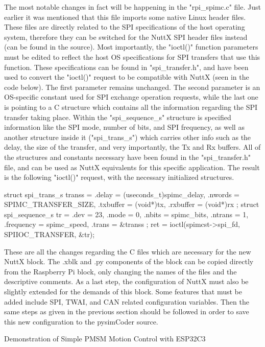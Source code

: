 \quad The most notable changes in fact will be happening in the "rpi_spimc.c" file. Just earlier it was mentioned
that this file imports some native Linux header files. These files are directly related to the SPI specifications
of the host operating system, therefore they can be switched for the NuttX SPI header files instead (can be found
in the source). Most importantly, the "ioctl()" function parameters must be edited to reflect the host OS
specifications for SPI transfers that use this function. These specifications can be found in "spi_transfer.h",
and have been used to convert the "ioctl()" request to be compatible with NuttX (seen in the code below). The
first parameter remains unchanged. The second parameter is an OS-specific constant used for SPI exchange operation
requests, while the last one is pointing to a C structure which contains all the information regarding the SPI
transfer taking place. Within the "spi_sequence_s" structure is specified information like the SPI mode, number of
bits, and SPI frequency, as well as another structure inside it ("spi_trans_s") which carries other info such as the
delay, the size of the transfer, and very importantly, the Tx and Rx buffers. All of the structures and constants
necessary have been found in the "spi_transfer.h" file, and can be used as NuttX equivalents for this specific
application. The result is the following "ioctl()" request, with the necessary initialized structures. 

\begtt
struct spi_trans_s transs = {
    .delay = (useconds_t)spimc_delay,
    .nwords = SPIMC_TRANSFER_SIZE,
    .txbuffer = (void*)tx,
    .rxbuffer = (void*)rx };
struct spi_sequence_s tr = {
	.dev = 23,
	.mode = 0,
	.nbits = spimc_bits,
    .ntrans = 1,
    .frequency = spimc_speed,
    .trans = &transs };  
ret = ioctl(spimcst->spi_fd, SPIIOC_TRANSFER, &tr);
\endtt

\quad These are all the changes regarding the C files which are necessary for the new NuttX block. The .xblk and
.py components of the block can be copied directly from the Raspberry Pi block, only changing the names of the files
and the descriptive comments. As a last step, the configuration of NuttX must also be slightly extended for the
demands of this block. Some features that must be added include SPI, TWAI, and CAN related configuration variables.
Then the same steps as given in the previous section should be followed in order to save this new configuration to
the pysimCoder source.

\secc Demonstration of Simple PMSM Motion Control with ESP32C3

